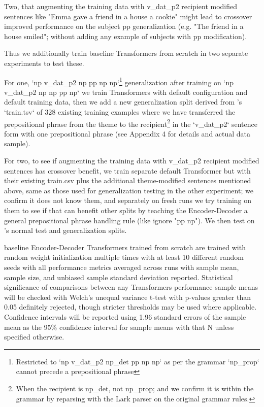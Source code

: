 \documentclass[11pt]{article}
\begin{document}
Two, that augmenting the training data with v\_dat\_p2 recipient modified sentences like "Emma gave a friend in a house a cookie" might lead to crossover improved performance on the subject pp generalization (e.g. "The friend in a house smiled"; without adding any example of subjects with pp modification).

Thus we additionally train \cite{Wu2023} baseline Transformers from scratch in two separate experiments to test these.

For one, `np v\_dat\_p2 np pp np np`\footnote{Restricted to `np v\_dat\_p2 np\_det pp np np` as per the grammar `np\_prop` cannot precede a prepositional phrase} generalization after training on `np v\_dat\_p2 np np pp np` we train \cite{Wu2023} Transformers with default configuration and default training data, then we add a new generalization split derived from \cite{Wu2023}'s `train.tsv` of 328 existing training examples where we have transferred the prepositional phrase from the theme to the recipient\footnote{When the recipient is np\_det, not np\_prop; and we confirm it is within the grammar by reparsing with the Lark parser on the original grammar rules.} in the `v\_dat\_p2` sentence form with one prepositional phrase (see Appendix 4 for details and actual data sample).

For two, to see if augmenting the training data with v\_dat\_p2 recipient modified sentences has crossover benefit, we train separate default \cite{Wu2023} Transformer but with their existing train.csv plus the additional theme-modified sentences mentioned above, same as those used for generalization testing in the other experiment; we confirm it does not know them, and separately on fresh runs we try training on them to see if that can benefit other splits by teaching the Encoder-Decoder a general prepositional phrase handling rule (like ignore "pp np"). We then test on \cite{Wu2023}'s normal test and generalization splits.

\cite{Wu2023} baseline Encoder-Decoder Transformers trained from scratch are trained with random weight initialization multiple times with at least 10 different random seeds with all performance metrics averaged across runs with sample mean, sample size, and unbiased sample standard deviation reported. Statistical significance of comparisons between any Transformers performance sample means will be checked with Welch's unequal variance t-test with p-values greater than 0.05 definitely rejected, though stricter thresholds may be used where applicable. Confidence intervals will be reported using 1.96 standard errors of the sample mean as the 95\% confidence interval for sample means with that N unless specified otherwise.
\end{document}
